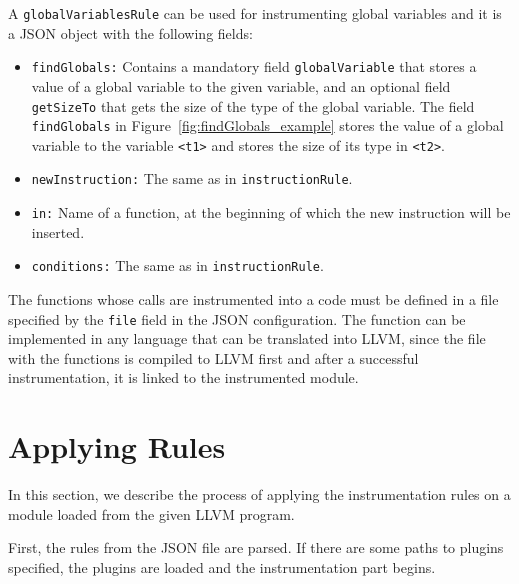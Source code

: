 \noindent A \texttt{globalVariablesRule} can be used for instrumenting global
variables and it is a JSON object with the following fields:
\begin{itemize}
    \item \texttt{findGlobals:} Contains a mandatory field
    \texttt{globalVariable} that stores a value of a global variable to the
    given variable, and an optional field \texttt{getSizeTo} that gets the size
    of the type of the global variable. The field \texttt{findGlobals} in
    Figure~\ref{fig:findGlobals_example} stores the value of a global variable
    to the variable \texttt{<t1>} and stores the size of its type in
    \texttt{<t2>}.

    \begin{minipage}{\linewidth}
        
        \label{fig:findGlobals_example}
      \end{minipage}

    \item \texttt{newInstruction:} The same as in \texttt{instructionRule}.
    \item \texttt{in:} Name of a function, at the beginning of which the new
    instruction will be inserted.
    \item \texttt{conditions:} The same as in \texttt{instructionRule}.
\end{itemize}

The functions whose calls are instrumented into a code must be defined in a
file specified by the \texttt{file} field in the JSON configuration. The
function can be implemented in any language that can be translated into LLVM,
since the file with the functions is compiled to LLVM first and after a
successful instrumentation, it is linked to the instrumented module.

\section{Applying Rules}

In this section, we describe the process of applying the instrumentation
rules on a module loaded from the given LLVM program.

First, the rules from the JSON file are parsed. If there are some paths to
plugins specified, the plugins are loaded and the instrumentation part begins.

